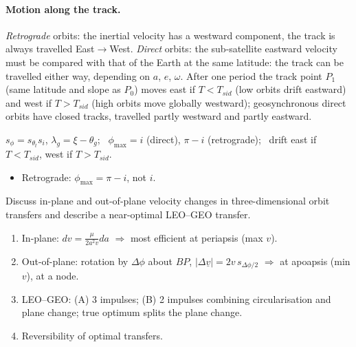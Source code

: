 \paragraph{Motion along the track.} \emph{Retrograde} orbits: the inertial velocity has a westward component, the track is always travelled East$\to$West.
\emph{Direct} orbits: the sub-satellite eastward velocity must be compared with that of the Earth at the same latitude: the track can be travelled
either way, depending on $a$, $e$, $\omega$. After one period the track point $P_1$ (same latitude and slope as $P_0$) moves east if
$T<T_{sid}$ (low orbits drift eastward) and west if $T>T_{sid}$ (high orbits move globally westward); geosynchronous direct orbits have closed
tracks, travelled partly westward and partly eastward.
\begin{keyf}
$s_\phi=s_{\theta_t}s_i$, $\lambda_g=\xi-\theta_g$; \ $\phi_{\max}=i$ (direct), $\pi-i$ (retrograde); \ drift east if $T<T_{sid}$, west if $T>T_{sid}$.
\end{keyf}
\pitfalls
\begin{itemize}
\item Retrograde: $\phi_{\max}=\pi-i$, not $i$.
\end{itemize}

\begin{qbox}
Discuss in-plane and out-of-plane velocity changes in three-dimensional orbit transfers and describe a near-optimal LEO--GEO transfer.
\end{qbox}
\begin{outline}
\begin{enumerate}
\item In-plane: $dv=\frac{\mu}{2a^2v}da$ $\Rightarrow$ most efficient at periapsis (max $v$).
\item Out-of-plane: rotation by $\Delta\phi$ about $BP$, $|\Delta\underline v|=2v\,s_{\Delta\phi/2}$ $\Rightarrow$ at apoapsis (min $v$), at a node.
\item LEO--GEO: (A) 3 impulses; (B) 2 impulses combining circularisation and plane change; true optimum splits the plane change.
\item Reversibility of optimal transfers.
\end{enumerate}
\end{outline}
\answer
